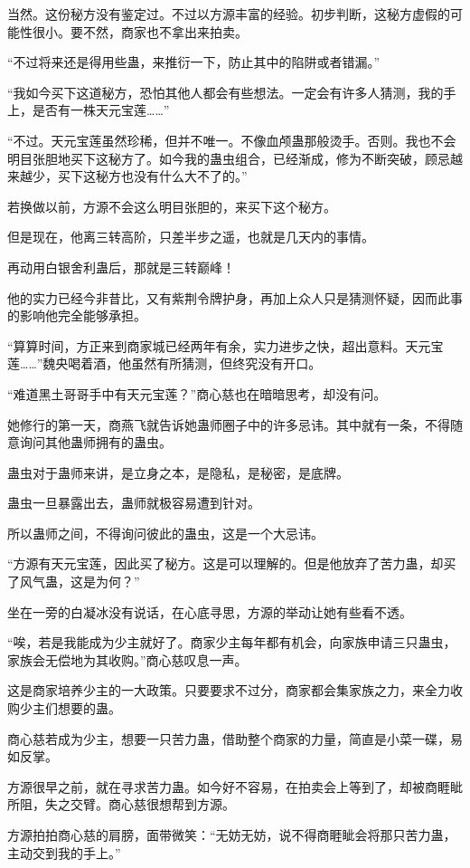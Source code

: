 \begin{this_body}
当然。这份秘方没有鉴定过。不过以方源丰富的经验。初步判断，这秘方虚假的可能性很小。要不然，商家也不拿出来拍卖。

“不过将来还是得用些蛊，来推衍一下，防止其中的陷阱或者错漏。”

“我如今买下这道秘方，恐怕其他人都会有些想法。一定会有许多人猜测，我的手上，是否有一株天元宝莲……”

“不过。天元宝莲虽然珍稀，但并不唯一。不像血颅蛊那般烫手。否则。我也不会明目张胆地买下这秘方了。如今我的蛊虫组合，已经渐成，修为不断突破，顾忌越来越少，买下这秘方也没有什么大不了的。”

若换做以前，方源不会这么明目张胆的，来买下这个秘方。

但是现在，他离三转高阶，只差半步之遥，也就是几天内的事情。

再动用白银舍利蛊后，那就是三转巅峰！

他的实力已经今非昔比，又有紫荆令牌护身，再加上众人只是猜测怀疑，因而此事的影响他完全能够承担。

“算算时间，方正来到商家城已经两年有余，实力进步之快，超出意料。天元宝莲……”魏央喝着酒，他虽然有所猜测，但终究没有开口。

“难道黑土哥哥手中有天元宝莲？”商心慈也在暗暗思考，却没有问。

她修行的第一天，商燕飞就告诉她蛊师圈子中的许多忌讳。其中就有一条，不得随意询问其他蛊师拥有的蛊虫。

蛊虫对于蛊师来讲，是立身之本，是隐私，是秘密，是底牌。

蛊虫一旦暴露出去，蛊师就极容易遭到针对。

所以蛊师之间，不得询问彼此的蛊虫，这是一个大忌讳。

“方源有天元宝莲，因此买了秘方。这是可以理解的。但是他放弃了苦力蛊，却买了风气蛊，这是为何？”

坐在一旁的白凝冰没有说话，在心底寻思，方源的举动让她有些看不透。

“唉，若是我能成为少主就好了。商家少主每年都有机会，向家族申请三只蛊虫，家族会无偿地为其收购。”商心慈叹息一声。

这是商家培养少主的一大政策。只要要求不过分，商家都会集家族之力，来全力收购少主们想要的蛊。

商心慈若成为少主，想要一只苦力蛊，借助整个商家的力量，简直是小菜一碟，易如反掌。

方源很早之前，就在寻求苦力蛊。如今好不容易，在拍卖会上等到了，却被商睚眦所阻，失之交臂。商心慈很想帮到方源。

方源拍拍商心慈的肩膀，面带微笑：“无妨无妨，说不得商睚眦会将那只苦力蛊，主动交到我的手上。”


\end{this_body}
